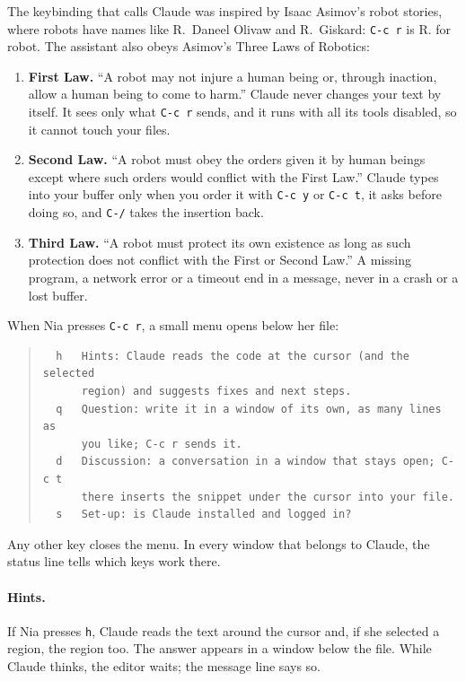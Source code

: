 \documentclass[a4paper,12pt,openany]{book}
\begin{document}
The keybinding that calls Claude was inspired by Isaac Asimov's
robot stories, where robots have names like R.~Daneel Olivaw and
R.~Giskard: \verb|C-c r| is R. for robot. The assistant also obeys
Asimov's Three Laws of Robotics:
\begin{enumerate}
\item {\bf First Law.} ``A robot may not injure a human being or,
  through inaction, allow a human being to come to harm.''
  Claude never changes your text by itself. It sees only what
  \verb|C-c r| sends, and it runs with all its tools disabled,
  so it cannot touch your files.
\item {\bf Second Law.} ``A robot must obey the orders given it by
  human beings except where such orders would conflict with the First
  Law.'' Claude types into your buffer only when you order it with
  \verb|C-c y| or \verb|C-c t|, it asks before doing so, and \verb|C-/|
  takes the insertion back.
\item {\bf Third Law.} ``A robot must protect its own existence as long
  as such protection does not conflict with the First or Second Law.''
  A missing program, a network error or a timeout end in a message,
  never in a crash or a lost buffer.
\end{enumerate}

When Nia presses \verb|C-c r|, a small menu opens below her file:
\begin{quote}
\begin{verbatim}
  h   Hints: Claude reads the code at the cursor (and the selected
      region) and suggests fixes and next steps.
  q   Question: write it in a window of its own, as many lines as
      you like; C-c r sends it.
  d   Discussion: a conversation in a window that stays open; C-c t
      there inserts the snippet under the cursor into your file.
  s   Set-up: is Claude installed and logged in?
\end{verbatim}
\end{quote}
Any other key closes the menu. In every window that belongs to
Claude, the status line tells which keys work there.

\paragraph{Hints.} If Nia presses \verb|h|, Claude reads the text
around the cursor and, if she selected a region, the region too.
The answer appears in a window below the file. While Claude thinks,
the editor waits; the message line says so.
\end{document}
